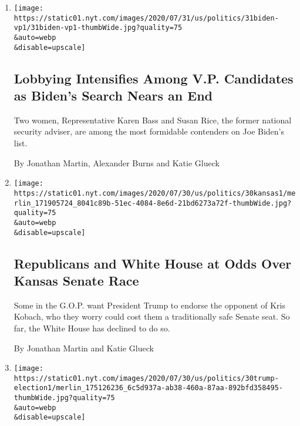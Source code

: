 \begin{enumerate}
\def\labelenumi{\arabic{enumi}.}
\item
  \href{/2020/07/31/us/politics/joseph-biden-vice-president.html}{}

  \texttt{[image: https://static01.nyt.com/images/2020/07/31/us/politics/31biden-vp1/31biden-vp1-thumbWide.jpg?quality=75\\\&auto=webp\\\&disable=upscale]}

  \hypertarget{lobbying-intensifies-among-vp-candidates-as-bidens-search-nears-an-end}{%
  \subsection{Lobbying Intensifies Among V.P. Candidates as Biden's
  Search Nears an
  End}\label{lobbying-intensifies-among-vp-candidates-as-bidens-search-nears-an-end}}

  Two women, Representative Karen Bass and Susan Rice, the former
  national security adviser, are among the most formidable contenders on
  Joe Biden's list.

  By Jonathan Martin, Alexander Burns and Katie Glueck
\item
  \href{/2020/07/30/us/politics/kansas-senate-kobach-trump.html}{}

  \texttt{[image: https://static01.nyt.com/images/2020/07/30/us/politics/30kansas1/merlin\_171905724\_8041c89b-51ec-4084-8e6d-21bd6273a72f-thumbWide.jpg?quality=75\\\&auto=webp\\\&disable=upscale]}

  \hypertarget{republicans-and-white-house-at-odds-over-kansas-senate-race}{%
  \subsection{Republicans and White House at Odds Over Kansas Senate
  Race}\label{republicans-and-white-house-at-odds-over-kansas-senate-race}}

  Some in the G.O.P. want President Trump to endorse the opponent of
  Kris Kobach, who they worry could cost them a traditionally safe
  Senate seat. So far, the White House has declined to do so.

  By Jonathan Martin and Katie Glueck
\item
  \href{/2020/07/30/us/politics/trump-delay-2020-election.html}{}

  \texttt{[image: https://static01.nyt.com/images/2020/07/30/us/politics/30trump-election1/merlin\_175126236\_6c5d937a-ab38-460a-87aa-892bfd358495-thumbWide.jpg?quality=75\\\&auto=webp\\\&disable=upscale]}


\end{enumerate}
